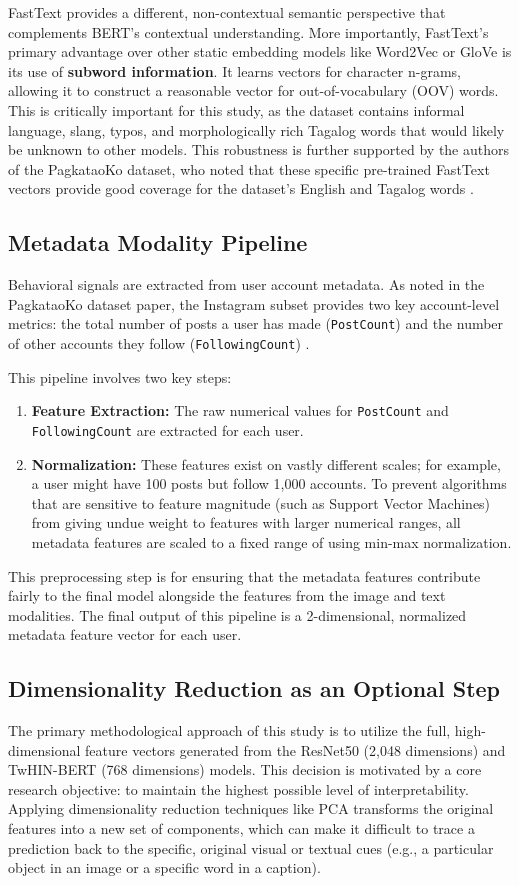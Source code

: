 FastText provides a different, non-contextual semantic perspective that complements BERT's contextual understanding. More importantly, FastText's primary advantage over other static embedding models like Word2Vec or GloVe is its use of \textbf{subword information}. It learns vectors for character n-grams, allowing it to construct a reasonable vector for out-of-vocabulary (OOV) words. This is critically important for this study, as the dataset contains informal language, slang, typos, and morphologically rich Tagalog words that would likely be unknown to other models. This robustness is further supported by the authors of the PagkataoKo dataset, who noted that these specific pre-trained FastText vectors provide good coverage for the dataset's English and Tagalog words \citep{tighe_acorda_2022}.

\subsection{Metadata Modality Pipeline}
Behavioral signals are extracted from user account metadata. As noted in the PagkataoKo dataset paper, the Instagram subset provides two key account-level metrics: the total number of posts a user has made (\texttt{PostCount}) and the number of other accounts they follow (\texttt{FollowingCount}) \citep{tighe_acorda_2022}.

This pipeline involves two key steps:
\begin{enumerate}
	\item \textbf{Feature Extraction:} The raw numerical values for \texttt{PostCount} and \texttt{FollowingCount} are extracted for each user.
	\item \textbf{Normalization:} These features exist on vastly different scales; for example, a user might have 100 posts but follow 1,000 accounts. To prevent algorithms that are sensitive to feature magnitude (such as Support Vector Machines) from giving undue weight to features with larger numerical ranges, all metadata features are scaled to a fixed range of  using min-max normalization.
\end{enumerate}
This preprocessing step is for ensuring that the metadata features contribute fairly to the final model alongside the features from the image and text modalities. The final output of this pipeline is a 2-dimensional, normalized metadata feature vector for each user.

\subsection{Dimensionality Reduction as an Optional Step}
The primary methodological approach of this study is to utilize the full, high-dimensional feature vectors generated from the ResNet50 (2,048 dimensions) and TwHIN-BERT (768 dimensions) models. This decision is motivated by a core research objective: to maintain the highest possible level of interpretability. Applying dimensionality reduction techniques like PCA transforms the original features into a new set of components, which can make it difficult to trace a prediction back to the specific, original visual or textual cues (e.g., a particular object in an image or a specific word in a caption).

